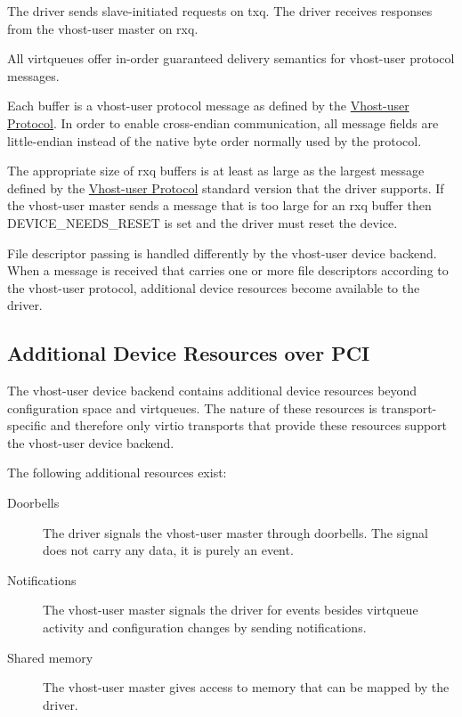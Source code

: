 The driver sends slave-initiated requests on txq.  The driver receives
responses from the vhost-user master on rxq.

All virtqueues offer in-order guaranteed delivery semantics for vhost-user
protocol messages.

Each buffer is a vhost-user protocol message as defined by the
\hyperref[intro:Vhost-user Protocol]{Vhost-user Protocol}.  In order to enable
cross-endian communication, all message fields are little-endian instead of the
native byte order normally used by the protocol.

The appropriate size of rxq buffers is at least as large as the largest message
defined by the \hyperref[intro:Vhost-user Protocol]{Vhost-user Protocol}
standard version that the driver supports.  If the vhost-user master sends a
message that is too large for an rxq buffer then DEVICE_NEEDS_RESET is set and
the driver must reset the device.

File descriptor passing is handled differently by the vhost-user device
backend.  When a message is received that carries one or more file descriptors
according to the vhost-user protocol, additional device resources become
available to the driver.

\subsection{Additional Device Resources over PCI}\label{sec:Device Types / Vhost-user Device Backend / Additional Device Resources over PCI}

The vhost-user device backend contains additional device resources beyond
configuration space and virtqueues.  The nature of these resources is
transport-specific and therefore only virtio transports that provide these
resources support the vhost-user device backend.

The following additional resources exist:
\begin{description}
  \item[Doorbells] The driver signals the vhost-user master through doorbells.  The signal does not carry any data, it is purely an event.
  \item[Notifications] The vhost-user master signals the driver for events besides virtqueue activity and configuration changes by sending notifications.
  \item[Shared memory] The vhost-user master gives access to memory that can be mapped by the driver.
\end{description}


